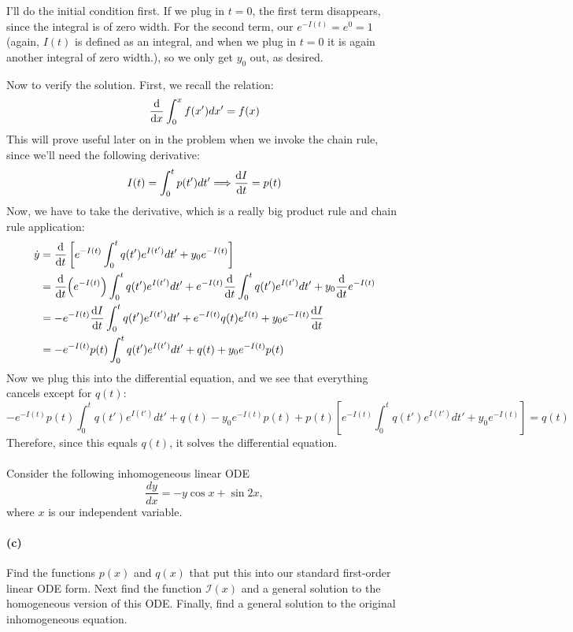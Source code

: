 \documentclass{article}
\begin{document}
\begin{solution}
	I'll do the initial condition first. If we plug in $t = 0$, the first term disappears, since 
	the integral is of zero width. For the second term, our $e^{-I(t)} = e^0 = 1$ (again, 
	$I(t)$ is defined as an integral, and when we plug in $t = 0$ it is again another integral
	of zero width.), so we only get $y_0$ out, as desired. 

	Now to verify the solution. First, we recall the relation:
	\[
		\dv{x} \int_0^x f(x') dx' = f(x)
	\] 
	This will prove useful later on in the problem when we invoke the chain rule, since we'll need the 
	following derivative: 
	\[
		I(t) = \int_0^t p(t') dt' \Longrightarrow \dv{I}{t} = p(t)
	\] 
	Now, we have to take the derivative, which is a really big product rule and chain rule application:
	\begin{align*}
		\dot y &= \dv{t} \left[ e^{-I(t)} \int_0^t q(t') e^{I(t')} dt' + y_0e^{-I(t)}\right]\\
			   &= \dv{t}(e^{-I(t)}) \int_0^t q(t') e^{I(t')} dt' + e^{-I(t)} \dv{t}\int_0^t q(t') e^{I(t')} dt' + y_0 \dv{t} e^{-I(t)} \\
			   &= -e^{-I(t)} \dv{I}{t} \int_0^t q(t') e^{I(t')} dt' + e^{-I(t)} q(t) e^{I(t)} + y_0e^{-I(t)}\dv{I}{t} \\
			   &= -e^{-I(t)}p(t) \int_0^t q(t') e^{I(t')} dt' + q(t) + y_0e^{-I(t)} p(t) 
	\end{align*}
	Now we plug this into the differential equation, and we see that everything cancels except for 
	$q(t)$: 
	\[
		-e^{-I(t)} p(t) \int_0^t q(t') e^{I(t')} dt' + q(t) - y_0 e^{-I(t)} p(t) + p(t)\left[
		e^{-I(t)} \int_0^t q(t') e^{I(t')} dt' + y_0e^{-I(t)}\right] = q(t) 
	\] 
	Therefore, since this equals $q(t)$, it solves the differential equation.
\end{solution}

\phline
\paragraph{}
Consider the following inhomogeneous linear ODE
	\begin{equation*}
		\frac{dy}{dx} = -y\cos x + \sin 2x,
	\end{equation*}
where $x$ is our independent variable.

\paragraph{(c)}
Find the functions $p(x)$ and $q(x)$ that put this into our standard first-order linear ODE form.  Next find the function $\mathcal{I}(x)$ and a general solution to 
the homogeneous version of this ODE.  Finally, find a general solution to the original inhomogeneous equation.
\end{document}
